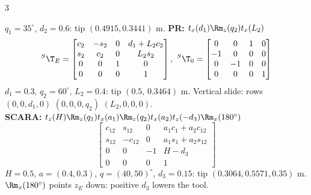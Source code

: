 \begin{multicols}{3}
\begin{fbx}
$q_1{=}35^\circ$, $d_2{=}0.6$: tip $(0.4915,0.3441)$ m.
\textbf{PR:} $t_x(d_1)\Rm_z(q_2)t_x(L_2)$
\[{}^S\T_E=\begin{bmatrix}c_2&-s_2&0&d_1+L_2c_2\\s_2&c_2&0&L_2s_2\\0&0&1&0\\0&0&0&1\end{bmatrix},\ {}^S\T_0=\begin{bmatrix}0&0&1&0\\-1&0&0&0\\0&-1&0&0\\0&0&0&1\end{bmatrix}\]
$d_1{=}0.3,\,q_2{=}60^\circ,\,L_2{=}0.4$: tip $(0.5,\,0.3464)$ m. Vertical slide: rows $(0,0,d_1,0)$ $(0,0,0,q_2)$ $(L_2,0,0,0)$.\\
\textbf{SCARA:} $t_z(H)\Rm_z(q_1)t_x(a_1)\Rm_z(q_2)t_x(a_2)t_z(-d_3)\Rm_x(180^\circ)$
\[\begin{bmatrix}c_{12}&s_{12}&0&a_1c_1+a_2c_{12}\\s_{12}&-c_{12}&0&a_1s_1+a_2s_{12}\\0&0&-1&H-d_3\\0&0&0&1\end{bmatrix}\]
$H{=}0.5$, $a{=}(0.4,0.3)$, $q{=}(40,50)^\circ$, $d_3{=}0.15$: tip $(0.3064,0.5571,0.35)$ m. 
$\Rm_x(180^\circ)$ points $z_E$ down: positive $d_3$ lowers the tool. \chk
\end{fbx}


\end{multicols}
